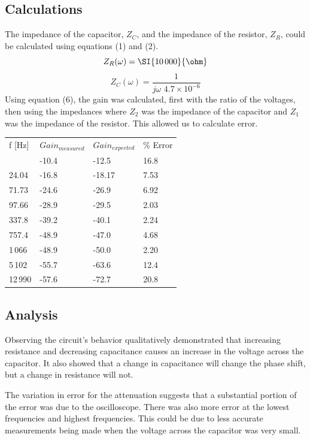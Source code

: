 \documentclass[twocolumn, amsmath]{revtex4}
\begin{document}
\subsection{Calculations}

The impedance of the capacitor, $Z_C$, and the impedance of the resistor, $Z_R$, could be calculated using equations (1) and (2).\\
$$Z_R(\omega)=\SI{10\,000}{\ohm}$$
$$Z_C(\omega)=\frac{1}{j \omega \,\, 4.7\times10^{-6} }$$
Using equation (6), the gain was calculated, first with the ratio of the voltages, then using the impedances where $Z_2$ was the impedance of the capacitor and $Z_1$ was the impedance of the resistor. This allowed us to calculate error.
\begin{center}
	\begin{ruledtabular}
    \begin{tabular}{ l  l  l l}
    f [Hz] & $Gain_{measured}$& $Gain_{expected}$ &  \% Error\\ \colrule
10.92&-10.4&-12.5	&  16.8 \\
24.04&-16.8&-18.17	&  7.53\\
71.73&-24.6&-26.9	&  6.92\\
97.66&-28.9&-29.5	&  2.03\\
337.8&-39.2&-40.1	&  2.24\\
757.4&-48.9&-47.0	&  4.68\\
1\,066&-48.9&-50.0	&  2.20\\
5\,102&-55.7&-63.6	&  12.4\\
12\,990&-57.6&-72.7	&  20.8\\
    \end{tabular}
    \end{ruledtabular}
\end{center}

 
\subsection{Analysis}

Observing the circuit's behavior qualitatively demonstrated that increasing resistance and decreasing capacitance causes an increase in the voltage across the capacitor. It also showed that a change in capacitance will change the phase shift, but a change in resistance will not.

The variation in error for the attenuation suggests that a substantial portion of the error was due to the oscilloscope. There was also more error at the lowest frequencies and highest frequencies. This could be due to less accurate measurements being made when the voltage across the capacitor was very small.
\end{document}

